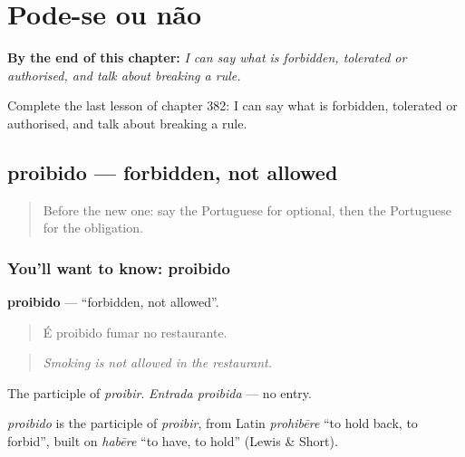 
\chapter{Pode-se ou não}
\label{ch:pt-pode-se-ou-nao}

\begin{chapteropening}
\textbf{By the end of this chapter:} \emph{I can say what is forbidden, tolerated or authorised, and talk about breaking a rule.}

Complete the last lesson of chapter 382: I can say what is forbidden, tolerated or authorised, and talk about breaking a rule.
\end{chapteropening}

\section[proibido]{proibido — forbidden, not allowed}

\label{lesson:PT-C382-proibido}



\begin{quote}
Before the new one: say the Portuguese for optional, then the Portuguese for the obligation.
\end{quote}

\subsection*{You'll want to know: proibido}
\textbf{proibido} — \textquotedblleft{}forbidden, not allowed\textquotedblright{}.

\begin{quote}
É proibido fumar no restaurante.
\end{quote}

\begin{quote}
\emph{Smoking is not allowed in the restaurant.}
\end{quote}

The participle of \emph{proibir}. \emph{Entrada proibida} — no entry.

\begin{cousinweb}
\emph{proibido} is the participle of \emph{proibir}, from Latin \emph{prohibēre} \textquotedblleft{}to hold back, to forbid\textquotedblright{}, built on \emph{habēre} \textquotedblleft{}to have, to hold\textquotedblright{} (Lewis \& Short).
\end{cousinweb}


